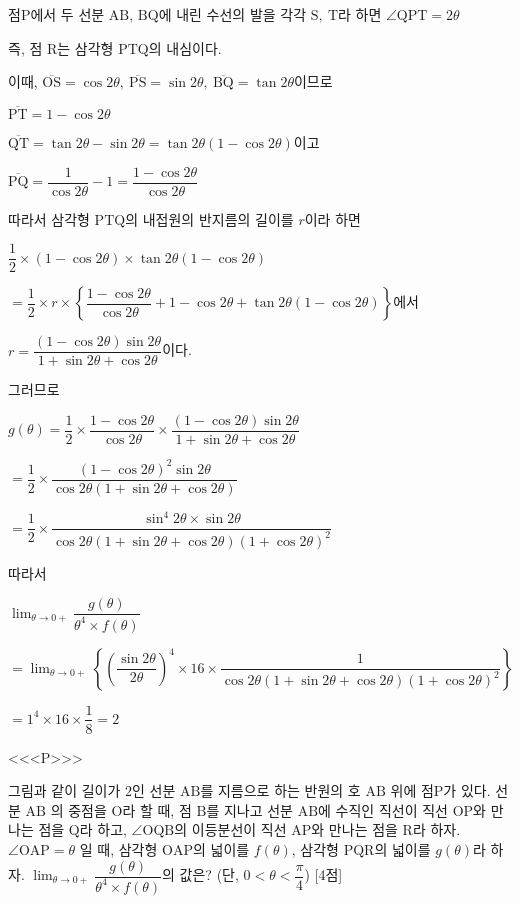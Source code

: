 \documentclass{oblivoir}
\begin{document}
점$\mathrm{P}$에서 두 선분 $\mathrm{AB}$, $\mathrm{BQ}$에 내린 수선의 발을 각각 $\mathrm{S},\:\mathrm{T}$라 하면 $\angle\mathrm{QPT}=2\theta$

즉, 점 $\mathrm{R}$는 삼각형 $\mathrm{PTQ}$의 내심이다.

이때, $\overline{\mathrm{OS}}=\cos 2\theta ,\:\overline{\mathrm{PS}}=\sin 2\theta ,\:\overline{\mathrm{BQ}}=\tan 2\theta$이므로

$\overline{\mathrm{PT}}=1-\cos 2\theta$

$\overline{\mathrm{QT}}=\tan 2\theta -\sin 2\theta =\tan 2\theta(1 -\cos 2\theta)$이고 

$\overline{\mathrm{PQ}}=\dfrac{1}{\cos 2\theta}-1=\dfrac{1-\cos 2\theta}{\cos 2\theta}$

따라서 삼각형 $\mathrm{PTQ}$의 내접원의 반지름의 길이를 $r$이라 하면 

$\dfrac{1}{2}\times(1-\cos 2\theta)\times\tan 2\theta(1-\cos 2\theta)$

$=\dfrac{1}{2}\times r\times\left\{\dfrac{1-\cos 2\theta}{\cos 2\theta}+1-\cos 2\theta +\tan 2\theta(1-\cos 2\theta)\right\}$에서

$r =\dfrac{(1-\cos 2\theta)\sin 2\theta}{1+\sin 2\theta +\cos 2\theta}$이다. 

그러므로

$g(\theta)=\dfrac{1}{2}\times\dfrac{1-\cos 2\theta}{\cos 2\theta}\times\dfrac{(1-\cos 2\theta)\sin 2\theta}{1+\sin 2\theta +\cos 2\theta}$

$=\dfrac{1}{2}\times\dfrac{(1-\cos 2\theta)^{2}\sin 2\theta}{\cos 2\theta(1+\sin 2\theta +\cos 2\theta)}$

$=\dfrac{1}{2}\times\dfrac{\sin^{4}2\theta\times\sin 2\theta}{\cos 2\theta(1+\sin 2\theta +\cos 2\theta)(1+\cos 2\theta)^{2}}$

따라서

$\displaystyle\lim_{\theta\rightarrow 0+}\dfrac{g(\theta)}{\theta^{4}\times f(\theta)}$

$ =\displaystyle\lim_{\theta\rightarrow 0+}\left\{\left(\dfrac{\sin 2\theta}{2\theta}\right)^{4}\times 16\times\dfrac{1}{\cos 2\theta(1+\sin 2\theta +\cos 2\theta)(1+\cos 2\theta)^{2}}\right\}$

$=1^{4}\times 16\times\dfrac{1}{8}=2$

<<<P>>>

그림과 같이 길이가 $2$인 선분 $\mathrm{AB}$를 지름으로 하는 반원의 호 $\mathrm{AB}$ 위에 점$\mathrm{P}$가 있다. 선분 $\mathrm{AB}$ 의 중점을 $\mathrm{O}$라 할 때, 점 $\mathrm{B}$를 지나고 선분 $\mathrm{AB}$에 수직인 직선이 직선 $\mathrm{OP}$와 만나는 점을 $\mathrm{Q}$라 하고, $\angle\mathrm{OQB}$의 이등분선이 직선 $\mathrm{AP}$와 만나는 점을 $\mathrm{R}$라 하자. $\angle\mathrm{OAP}=\theta$ 일 때, 삼각형 $\mathrm{OAP}$의 넓이를 $f(\theta)$,  삼각형 $\mathrm{PQR}$의 넓이를 $g(\theta)$라 하자. $\displaystyle\lim_{\theta\rightarrow 0+}\dfrac{g(\theta)}{\theta^{4}\times f(\theta)}$의 값은? (단, $0< \theta < \dfrac{\pi}{4}$) [4점]
\end{document}

